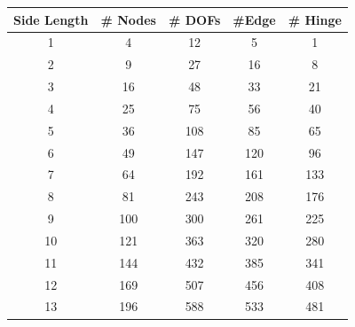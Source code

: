 \documentclass[letterpaper, 10 pt, conference]{ieeeconf}  %
\begin{document}
\onecolumn
\begin{figure}
\begin{minipage}[b]{.45\linewidth}
                \centering
                \begin{tabular}{|c|c|c|c|c|}
                \hline
                \textbf{Side Length} & \textbf{\# Nodes} & \textbf{\# DOFs} & \textbf{\#Edge} & \textbf{\# Hinge} \\ \hline
                1                    & 4                    & 12                  & 5                   & 1                    \\ \hline
                2                    & 9                    & 27                  & 16                  & 8                    \\ \hline
                3                    & 16                   & 48                  & 33                  & 21                   \\ \hline
                4                    & 25                   & 75                  & 56                  & 40                   \\ \hline
                5                    & 36                   & 108                 & 85                  & 65                   \\ \hline
                6                    & 49                   & 147                 & 120                 & 96                   \\ \hline
                7                    & 64                   & 192                 & 161                 & 133                  \\ \hline
                8                    & 81                   & 243                 & 208                 & 176                  \\ \hline
                9                    & 100                  & 300                 & 261                 & 225                  \\ \hline
                10                   & 121                  & 363                 & 320                 & 280                  \\ \hline
                11                   & 144                  & 432                 & 385                 & 341                  \\ \hline
                12                   & 169                  & 507                 & 456                 & 408                  \\ \hline
                13                   & 196                  & 588                 & 533                 & 481                  \\ \hline

\end{tabular}
\end{minipage}
\end{figure}
\end{document}
